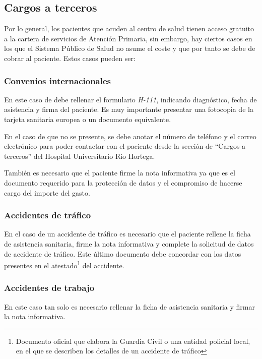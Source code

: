 \subsection{Cargos a terceros}

Por lo general, los pacientes que acuden al centro de salud tienen acceso gratuito a la cartera de servicios de Atención Primaria, sin embargo, hay ciertos casos en los que el Sistema Público de Salud no asume el coste y que por tanto se debe de cobrar al paciente.
Estos casos pueden ser:

\subsubsection{Convenios internacionales}

En este caso de debe rellenar el formulario \textit{H-111}, indicando diagnóstico, fecha de asistencia y firma del paciente.
Es muy importante presentar una fotocopia de la tarjeta sanitaria europea o un documento equivalente.

En el caso de que no se presente, se debe anotar el número de teléfono y el correo electrónico para poder contactar con el paciente desde la sección de ``Cargos a terceros'' del Hospital Universitario Rio Hortega.

También es necesario que el paciente firme la nota informativa ya que es el documento requerido para la protección de datos y el compromiso de hacerse cargo del importe del gasto.

\subsubsection{Accidentes de tráfico}

En el caso de un accidente de tráfico es necesario que el paciente rellene la ficha de asistencia sanitaria, firme la nota informativa y complete la solicitud de datos de accidente de tráfico.
Este último documento debe concordar con los datos presentes en el atestado\footnote{Documento oficial que elabora la Guardia Civil o una entidad policial local, en el que se describen los detalles de un accidente de tráfico} del accidente.

\subsubsection{Accidentes de trabajo}

En este caso tan solo es necesario rellenar la ficha de asistencia sanitaria y firmar la nota informativa.

